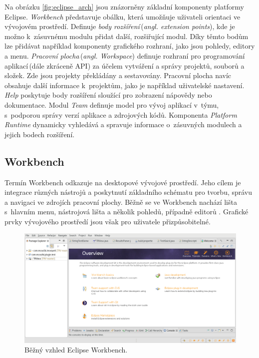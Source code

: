   Na obrázku \ref{fig:eclipse_arch} jsou znázorněny základní komponenty platformy Eclipse. \emph{Workbench} představuje obálku, která umožňuje uživateli orientaci ve vývojovém prostředí. Definuje \emph{body rozšíření}\,(\emph{angl. extension points}), kde je možno k~zásuvnému modulu přidat další, rozšiřující modul. Díky těmto bodům lze přidávat například komponenty grafického rozhraní, jako jsou pohledy, editory a menu. \emph{Pracovní plocha}\,(\emph{angl. Workspace}) definuje rozhraní pro programování aplikací\,(dále zkráceně API) za účelem vytváření a správy projektů, souborů a složek. Zde jsou projekty překládány a sestavovány. Pracovní plocha navíc obsahuje další informace k~projektům, jako je například uživatelské nastavení. \emph{Help} poskytuje body rozšíření sloužící pro zobrazení nápovědy nebo dokumentace. Modul \emph{Team} definuje model pro vývoj aplikací v~týmu, s~podporou správy verzí aplikace a zdrojových kódů. Komponenta \emph{Platform Runtime} dynamicky vyhledává a spravuje informace o~zásuvných modulech a jejich bodech rozšíření. 

    \subsection{Workbench}
    Termín Workbench odkazuje na desktopové vývojové prostředí. Jeho cílem je integrace různých nástrojů a poskytnutí základního schématu pro tvorbu, správu a navigaci ve zdrojích pracovní plochy. Běžně se ve Workbench nachází lišta s~hlavním menu, nástrojová lišta a několik pohledů, případně editorů \cite{eclipse-workbench}. Grafické prvky vývojového prostředí jsou však pro uživatele přizpůsobitelné.

    \begin{figure}
      \includegraphics[width=\textwidth, keepaspectratio, center]{obrazky-figures/eclipse_workbench.png}
      \caption{Běžný vzhled Eclipse Workbench.}
      \label{fig:eclipse_workbench}
    \end{figure}

